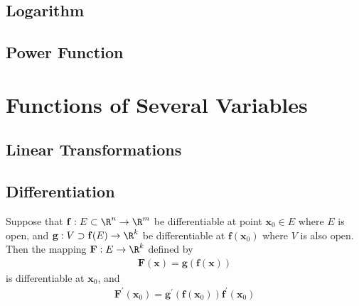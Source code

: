 \documentclass[thmcnt=section, 12pt]{elegantbook}
\begin{document}

\section{Logarithm}


\section{Power Function}



\chapter{Functions of Several Variables}


\section{Linear Transformations}


\section{Differentiation}


\begin{theorem} \label{thm:20}
    Suppose that $\mathbf{f}: E \subset \R^n \to \R^m$ be differentiable at point $\mathbf{x}_0 \in E$ where $E$ is open, and $\mathbf{g}: V \supset \mathbf{f}(E) \to \R^k$ be differentiable at $\mathbf{f}(\mathbf{x}_0)$ where $V$ is also open. Then the mapping $\mathbf{F}: E \to \R^k$ defined by 
    \begin{align*}
        \mathbf{F}(\mathbf{x}) = \mathbf{g}(\mathbf{f}(\mathbf{x}))
    \end{align*}
    is differentiable at $\mathbf{x}_0$, and 
    \begin{align*}
        \mathbf{F}^\prime(\mathbf{x}_0)
        = \mathbf{g}^\prime(\mathbf{f}(\mathbf{x}_0)) \mathbf{f}^\prime(\mathbf{x}_0)
    \end{align*}
\end{theorem}
\end{document}
